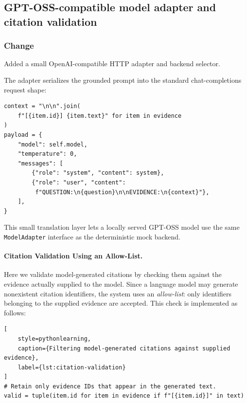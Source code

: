 
\subsection{GPT-OSS-compatible model adapter and citation validation}


\subsubsection{Change}

Added a small OpenAI-compatible HTTP adapter and backend selector.

The adapter serializes the grounded prompt into the standard chat-completions request shape:

\begin{verbatim}
context = "\n\n".join(
    f"[{item.id}] {item.text}" for item in evidence
)
payload = {
    "model": self.model,
    "temperature": 0,
    "messages": [
        {"role": "system", "content": system},
        {"role": "user", "content":
         f"QUESTION:\n{question}\n\nEVIDENCE:\n{context}"},
    ],
}
\end{verbatim}

This small translation layer lets a locally served GPT-OSS model use the same \texttt{ModelAdapter} interface as the deterministic mock backend.

\paragraph{Citation Validation Using an Allow-List.}
Here we validate model-generated citations by checking them
against the evidence actually supplied to the model. Since a language
model may generate nonexistent citation identifiers, the system uses
an \emph{allow-list}: only identifiers belonging to the supplied
evidence are accepted. This check is implemented as follows:

\begin{lstlisting}[
    style=pythonlearning,
    caption={Filtering model-generated citations against supplied evidence},
    label={lst:citation-validation}
]
# Retain only evidence IDs that appear in the generated text.
valid = tuple(item.id for item in evidence if f"[{item.id}]" in text)
\end{lstlisting}

